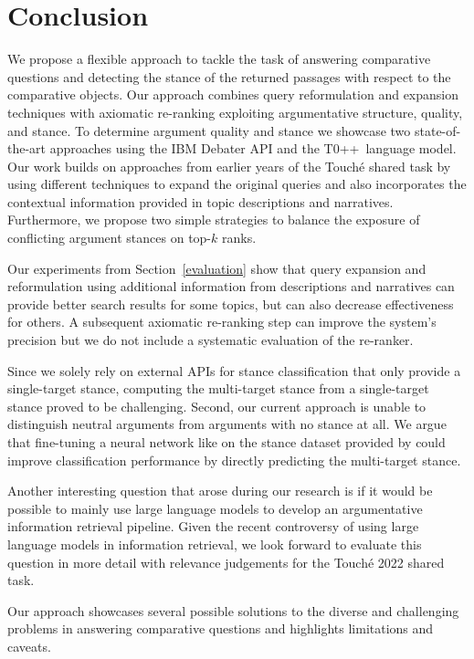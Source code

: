 \section{Conclusion}

We propose a flexible approach to tackle the task of answering comparative questions and detecting the stance of the returned passages with respect to the comparative objects.
Our approach combines query reformulation and expansion techniques with axiomatic re-ranking exploiting argumentative structure, quality, and stance.
To determine argument quality and stance we showcase two state-of-the-art approaches using the IBM Debater API and the T0++~language model.
Our work builds on approaches from earlier years of the Touché shared task by using different techniques to expand the original queries and also incorporates the contextual information provided in topic descriptions and narratives.
Furthermore, we propose two simple strategies to balance the exposure of conflicting argument stances on top-\(k\) ranks.

Our experiments from Section~\ref{evaluation} show that query expansion and reformulation using additional information from descriptions and narratives can provide better search results for some topics, but can also decrease effectiveness for others.
A subsequent axiomatic re-ranking step can improve the system's precision but we do not include a systematic evaluation of the re-ranker.

Since we solely rely on external APIs for stance classification that only provide a single-target stance, computing the multi-target stance from a single-target stance proved to be challenging.
Second, our current approach is unable to distinguish neutral arguments from arguments with no stance at all.
We argue that fine-tuning a neural network like \Bert on the stance dataset provided by \citeauthor{BondarenkoFKSGBPBSWPH2022} could improve classification performance by directly predicting the multi-target stance.

Another interesting question that arose during our research is if it would be possible to mainly use large language models to develop an argumentative information retrieval pipeline.
Given the recent controversy of using large language models in information retrieval, we look forward to evaluate this question in more detail with relevance judgements for the Touché 2022 shared task.

Our approach showcases several possible solutions to the diverse and challenging problems in answering comparative questions and highlights limitations and caveats.
